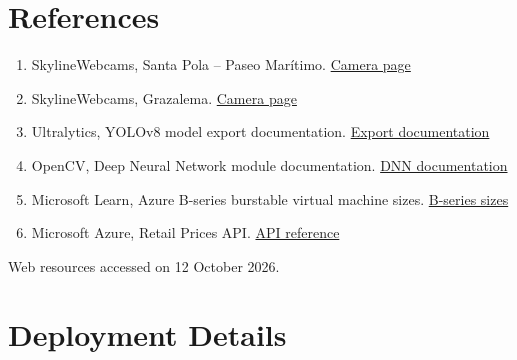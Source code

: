 \documentclass{article}
\begin{document}
\section{References}

\begin{enumerate}
    \item SkylineWebcams, Santa Pola -- Paseo Marítimo. \href{https://www.skylinewebcams.com/es/webcam/espana/comunidad-valenciana/santa-pola/paseo-maritimo.html}{Camera page}
    \item SkylineWebcams, Grazalema. \href{https://www.skylinewebcams.com/es/webcam/espana/andalucia/cadiz/grazalema.html}{Camera page}
    \item Ultralytics, YOLOv8 model export documentation. \href{https://docs.ultralytics.com/modes/export/}{Export documentation}
    \item OpenCV, Deep Neural Network module documentation. \href{https://docs.opencv.org/4.x/d6/d0f/group__dnn.html}{DNN documentation}
    \item Microsoft Learn, Azure B-series burstable virtual machine sizes. \href{https://learn.microsoft.com/azure/virtual-machines/sizes/general-purpose/b-series}{B-series sizes}
    \item Microsoft Azure, Retail Prices API. \href{https://prices.azure.com/api/retail/prices}{API reference}
\end{enumerate}

Web resources accessed on 12 October 2026.
\appendix
\section{Deployment Details}                       %
\end{document}
